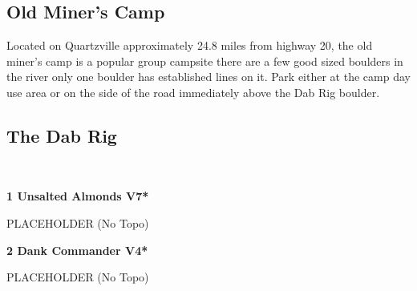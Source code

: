 \begin{multicols}{2}
		\section{Old Miner's Camp}\label{sa:Old Miner's Camp}
	\begin{minipage}{\columnwidth}
	Located on Quartzville approximately 24.8 miles from highway 20, the old miner's camp is a popular group campsite there are a few good sized boulders in the river only one boulder has established lines on it. Park either at the camp day use area or on the side of the road immediately above the Dab Rig boulder.
	\end{minipage}
	
			\begin{minipage}{\columnwidth}
			\subsection*{The Dab Rig}\label{bf:The Dab Rig}
			\
			
			\end{minipage}
			
					\begin{minipage}{\linewidth}	
					\label{rt:Unsalted Almonds}
\colorbox{Goldenrod!50}{
\parbox{0.95\textwidth}{
\textbf{
1 Unsalted Almonds V7*  
}
}
}

					\begin{adjustwidth}{0.5cm}{}				
					PLACEHOLDER
						\newline (No Topo) 
					\end{adjustwidth}
					\end{minipage}
					\begin{minipage}{\linewidth}	
					\label{rt:Dank Commander}
\colorbox{RoyalBlue!20}{
\parbox{0.95\textwidth}{
\textbf{
2 Dank Commander V4*  
}
}
}

					\begin{adjustwidth}{0.5cm}{}				
					PLACEHOLDER
						\newline (No Topo) 
					\end{adjustwidth}
					\end{minipage}
\end{multicols}
\clearpage